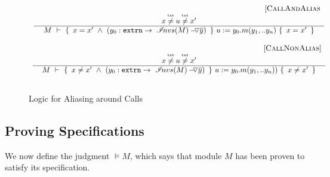 {\small{
\begin{figure}[hbt]
$\begin{array}{c}
\inferruleSD{\hspace{4.7cm}  [{\sc{CallAndAlias}}}
	{ 
	{   x \txtneq u\txtneq x'  }
	}
	{   \hproves{M}  { \ x=x'\   \wedge \ ({\external{y_0}}  \rightarrow \  \PushAS {y}{\extract{M}})\  }	{ \ u:=y_0.m(y_1,.. y_n)\  } { \  x=x'\ }	 }

\\ \\ 
\inferruleSD{\hspace{4.7cm} [{\sc{CallNonAlias}}]}	
{ 
		{ \ x \txtneq u \txtneq x'\   }
	}
	{   \hproves{M}   { \ x\neq x'\   \wedge \ ({\external{y_0}}  \rightarrow \  \PushAS {y}{\extract{M}})\  } { \ u:=y_0.m(y_1,.. y_n))\  } { \  x\neq x'\ }	 }
\\
\\
\end{array}
$
\caption{Logic for Aliasing around Calls }
\label{f:internal:alias:calls}
\end{figure}
}



\subsection{Proving \SpecLang Specifications}
\label{sect:wf}

We now define the judgment $\models M$, which says that module $M$ has been proven to satisfy its specification.

}
